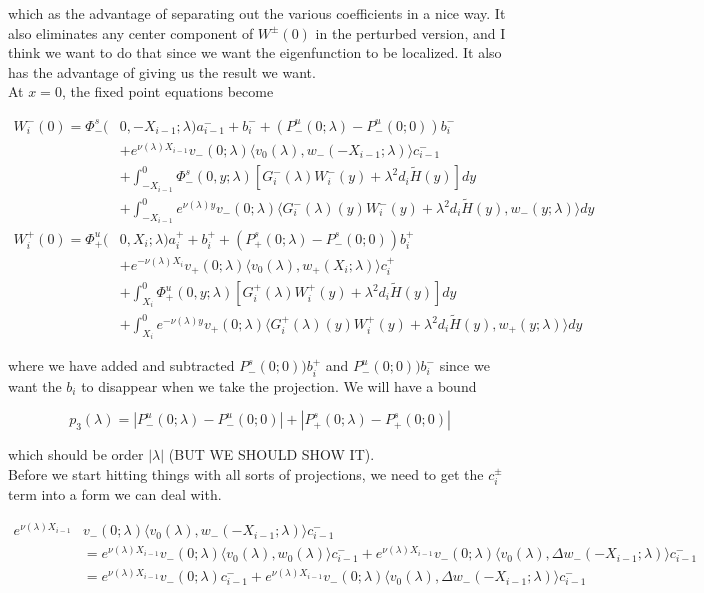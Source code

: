 \documentclass[12pt]{article}
\begin{document}
\begin{enumerate}
which as the advantage of separating out the various coefficients in a nice way. It also eliminates any center component of $W^\pm(0)$ in the perturbed version, and I think we want to do that since we want the eigenfunction to be localized. It also has the advantage of giving us the result we want.\\

At $x = 0$, the fixed point equations become

\begin{align*}
W_i^-(0) = \Phi^s_-(&0, -X_{i-1}; \lambda)a_{i-1}^- + b_i^- + (P^u_-(0; \lambda) - P^u_-(0; 0))b_i^- \\
&+ e^{\nu(\lambda)X_{i-1}} v_-(0; \lambda) \langle v_0(\lambda), w_-(-X_{i-1}; \lambda) \rangle c_{i-1}^- \\
&+ \int_{-X_{i-1}}^0 \Phi^s_-(0, y; \lambda) [ G_i^-(\lambda)W_i^-(y) + \lambda^2 d_i \tilde{H}(y) ] dy \\
&+ \int_{-X_{i-1}}^0
e^{\nu(\lambda)y} v_-(0; \lambda) \langle G_i^-(\lambda)(y)W_i^-(y) + \lambda^2 d_i \tilde{H}(y), w_-(y; \lambda) \rangle dy \\
W_i^+(0) = \Phi^u_+(&0, X_i; \lambda)a_i^+ + b_i^+ + (P^s_+(0; \lambda) - P^s_-(0; 0))b_i^+ \\
&+ e^{-\nu(\lambda) X_i} v_+(0; \lambda) \langle v_0(\lambda), w_+(X_i; \lambda) \rangle c_i^+ \\
&+ \int_{X_i}^0 \Phi^u_+(0, y; \lambda) [ G_i^+(\lambda)W_i^+(y) + \lambda^2 d_i \tilde{H}(y) ] dy \\
&+ \int_{X_i}^0 e^{-\nu(\lambda)y} v_+(0; \lambda) \langle G_i^+(\lambda)(y)W_i^+(y) + \lambda^2 d_i \tilde{H}(y), w_+(y; \lambda) \rangle dy
\end{align*}

where we have added and subtracted $P^s_-(0; 0))b_i^+$ and $P^u_-(0; 0))b_i^-$ since we want the $b_i$ to disappear when we take the projection. We will have a bound

\[
p_3(\lambda) = |P^u_-(0;\lambda) - P^u_-(0; 0)| + |P^s_+(0;\lambda) - P^s_+(0;0)|
\]

which should be order $|\lambda|$ (BUT WE SHOULD SHOW IT).\\

Before we start hitting things with all sorts of projections, we need to get the $c_i^\pm$ term into a form we can deal with. 

\begin{align*}
e^{\nu(\lambda)X_{i-1}} &v_-(0; \lambda) \langle v_0(\lambda), w_-(-X_{i-1}; \lambda) \rangle c_{i-1}^- \\
&= e^{\nu(\lambda)X_{i-1}} v_-(0; \lambda) \langle v_0(\lambda), w_0(\lambda) \rangle c_{i-1}^- + e^{\nu(\lambda)X_{i-1}} v_-(0; \lambda) \langle v_0(\lambda), \Delta w_-(-X_{i-1}; \lambda) \rangle c_{i-1}^- \\
&= e^{\nu(\lambda)X_{i-1}} v_-(0; \lambda) c_{i-1}^- + e^{\nu(\lambda)X_{i-1}} v_-(0; \lambda) \langle v_0(\lambda), \Delta w_-(-X_{i-1}; \lambda) \rangle c_{i-1}^-
\end{align*}


\end{enumerate}
\end{document}
